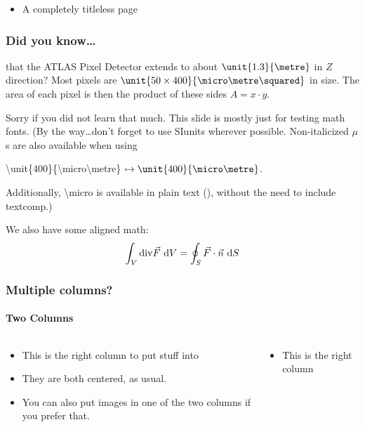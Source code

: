 \documentclass[10pt]{beamer}
\begin{document}
\begin{frame}
  \begin{itemize}
    \item 
      A completely titleless page
  \end{itemize}
\end{frame}

\begin{frame}
  \frametitle{Did you know\ldots}
  that the ATLAS Pixel Detector extends to about $\unit{1.3}{\metre}$ in $Z$ 
  direction?  Most pixels are $\unit{50\times 400}{\micro\metre\squared}$ in 
  size.
  The area of each pixel is then the product of these sides $A = x \cdot y$.

  Sorry if you did not learn that much. This slide is mostly just for testing 
  math fonts. (By the way\ldots don't forget to use SIunits wherever possible.
  Non-italicized $\mu$s are also available when using
  \begin{center}
    \textbackslash{}unit\{400\}\{\textbackslash{}micro\textbackslash{}metre\}
    $\mapsto \unit{400}{\micro\metre}$.
  \end{center}
  Additionally, \textbackslash{}micro is available in plain text (\micro), without
  the need to include textcomp.) 

  We also have some aligned math:
  \begin{align*}
    \int_{V} {\rm div}\vec F ~{\rm d}V = \oint_{S} \vec F \cdot \vec n ~\text dS
  \end{align*}
\end{frame}

\begin{frame}
  \frametitle{Multiple columns?}
  \framesubtitle{Two Columns}
  \begin{columns}
    \begin{column}{0.5\textwidth}
      \begin{itemize}
        \item 
          This is the right column to put stuff into
        \item
          They are both centered, as usual.
        \item
          You can also put images in one of the two columns if you prefer
          that.
      \end{itemize}
    \end{column}
    \begin{column}{0.5\textwidth}
      \begin{itemize}
        \item 
          This is the right column
      \end{itemize}
    \end{column}
  \end{columns}
\end{frame}
\end{document}
